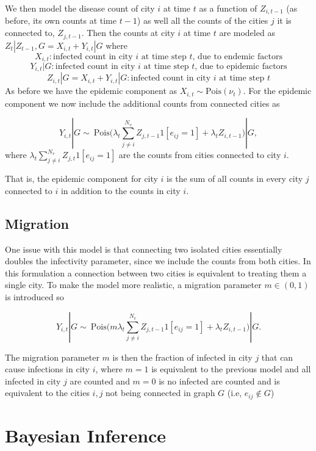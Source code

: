 \documentclass[11pt,a4paper]{article}
\numberwithin{equation}{section}
\begin{document}
We then model the disease count of city \(i\) at time \(t\) as a
function of \(Z_{i,t-1}\) (as before, its own counts at time \(t-1\)) as
well all the counts of the cities \(j\) it is connected to,
\(Z_{j,t-1}\). Then the counts at city \(i\) at time \(t\) are modeled
as \(Z_t|Z_{t-1}, G = X_{i, t} + Y_{i,t}|G\) where 
\[X_{i,t}: \text{infected count in city } i \text{ at time step } t \text{, due to endemic factors}   \]
\[Y_{i,t}|G : \text{infected count in city } i \text{ at time step } t \text{, due to epidemic factors}\]
\[Z_{i,t}|G = X_{i,t} + Y_{i,t}|G: \text{infected count in city } i \text{ at time step } t\]
As before we have the epidemic component as
\(X_{i,t} \sim\text{Pois}(\nu_t)\). For the epidemic component we now
include the additional counts from connected cities as

\[Y_{i,t}|G \sim ~ \text{Pois}\big(\lambda_t\sum_{j\neq i}^{N_v}Z_{j,t-1}1[e_{ij}=1]+ \lambda_tZ_{i,t-1}\big)|G, \]
where \(\lambda_t\sum_{j\neq i}^{N_v}Z_{j,t}1[e_{ij}=1]\) are the counts
from cities connected to city \(i\).

That is, the epidemic component for city \(i\) is the sum of all counts
in every city \(j\) connected to \(i\) in addition to the counts in city
\(i\).

\hypertarget{migration}{%
\subsection{Migration}\label{migration}}

One issue with this model is that connecting two isolated cities
essentially doubles the infectivity parameter, since we include the
counts from both cities. In this formulation a connection between two
cities is equivalent to treating them  a single city. To make the model
more realistic, a migration parameter \(m \in (0,1)\) is introduced so

\[Y_{i,t}|G \sim ~ \text{Pois}\big(m\lambda_t\sum_{j\neq i}^{N_v}Z_{j,t-1}1[e_{ij}=1]+ \lambda_tZ_{i,t-1}\big)|G.\]

The migration parameter \(m\) is then the fraction of infected in city
\(j\) that can cause infections in city \(i\), where \(m = 1\) is
equivalent to the previous model and all infected in city \(j\) are
counted and \(m = 0\) is no infected are counted and is equivalent to
the cities \(i,j\) not being connected in graph \(G\) (i.e,
\(e_{ij} \notin G\))

\hypertarget{bayesian-inference}{%
\section{Bayesian Inference}\label{bayesian-inference}}
\end{document}

